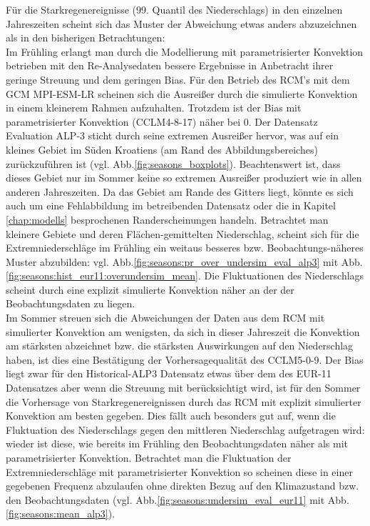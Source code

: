 Für die Starkregenereignisse (99. Quantil des Niederschlags) in den einzelnen Jahreszeiten scheint sich das Muster der Abweichung etwas anders abzuzeichnen als in den bisherigen Betrachtungen:\\
Im Frühling erlangt man durch die Modellierung mit parametrisierter Konvektion betrieben mit den Re-Analysedaten bessere Ergebnisse in Anbetracht ihrer geringe Streuung und dem geringen Bias. Für den Betrieb des RCM's mit dem GCM MPI-ESM-LR scheinen sich die Ausreißer durch die simulierte Konvektion in einem kleinerem Rahmen aufzuhalten. Trotzdem ist der Bias mit parametrisierter Konvektion (CCLM4-8-17) näher bei 0. Der Datensatz Evaluation ALP-3 sticht durch seine extremen Ausreißer hervor, was auf ein kleines Gebiet im Süden Kroatiens (am Rand des Abbildungsbereiches) zurückzuführen ist (vgl. Abb.\ref{fig:seasons_boxplots}). Beachtenswert ist, dass dieses Gebiet nur im Sommer keine so extremen Ausreißer produziert wie in allen anderen Jahreszeiten. Da das Gebiet am Rande des Gitters liegt, könnte es sich auch um eine Fehlabbildung im betreibenden Datensatz oder die in Kapitel \ref{chap:modells} besprochenen Randerscheinungen handeln. Betrachtet man kleinere Gebiete und deren Flächen-gemittelten Niederschlag, scheint sich für die Extremniederschläge im Frühling ein weitaus besseres bzw. Beobachtungs-näheres Muster abzubilden: vgl. Abb.\ref{fig:seasons:pr_over_undersim_eval_alp3} mit Abb.\ref{fig:seasons:hist_eur11:overundersim_mean}. Die Fluktuationen des Niederschlags scheint durch eine explizit simulierte Konvektion näher an der der Beobachtungsdaten zu liegen.\\
Im Sommer streuen sich die Abweichungen der Daten aus dem RCM mit simulierter Konvektion am wenigsten, da sich in dieser Jahreszeit die Konvektion am stärksten abzeichnet bzw. die stärksten Auswirkungen auf den Niederschlag haben, ist dies eine Bestätigung der Vorhersagequalität des CCLM5-0-9. Der Bias liegt zwar für den Historical-ALP3 Datensatz etwas über dem des EUR-11 Datensatzes aber wenn die Streuung mit berücksichtigt wird, ist für den Sommer die Vorhersage von Starkregenereignissen durch das RCM mit explizit simulierter Konvektion am besten gegeben. Dies fällt auch besonders gut auf, wenn die Fluktuation des Niederschlags gegen den mittleren Niederschlag aufgetragen wird: wieder ist diese, wie bereits im Frühling den Beobachtungsdaten näher als mit parametrisierter Konvektion. Betrachtet man die Fluktuation der Extremniederschläge mit parametrisierter Konvektion so scheinen diese in einer gegebenen Frequenz abzulaufen ohne direkten Bezug auf den Klimazustand bzw. den Beobachtungsdaten (vgl. Abb.\ref{fig:seasons:undersim_eval_eur11} mit Abb.\ref{fig:seasons:mean_alp3}).\\
